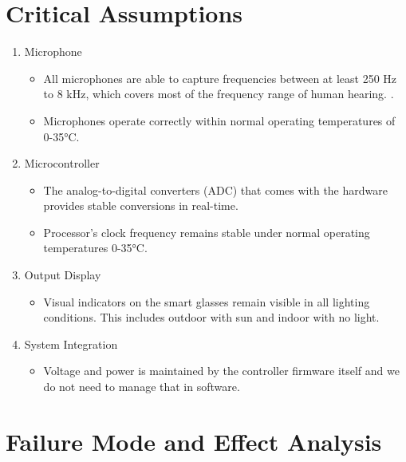 \documentclass{article}
\begin{document}
\section{Critical Assumptions}

\begin{enumerate}
    \item Microphone
    \begin{itemize}
        \item All microphones are able to capture frequencies between at least
        250 Hz to 8 kHz, which covers most of the frequency range of human
        hearing.
        \cite{MiracleEar2025}.
        \item Microphones operate correctly within normal operating temperatures
        of 0-35°C. 
    \end{itemize}
    
    \item Microcontroller
    \begin{itemize}
        \item The analog-to-digital converters (ADC) that comes with the
        hardware provides stable conversions in real-time.
        \item Processor's clock frequency remains stable under normal operating
        temperatures 0-35°C.
    \end{itemize}

    \item Output Display
    \begin{itemize}
        \item Visual indicators on the smart glasses remain visible in
        all lighting conditions. This includes outdoor with sun and indoor with
        no light. 
    \end{itemize}

    \item System Integration
    \begin{itemize}
        \item Voltage and power is maintained by the controller firmware itself
        and we do not need to manage that in software. 
    \end{itemize}
    
\end{enumerate}

\section{Failure Mode and Effect Analysis}
\end{document}
